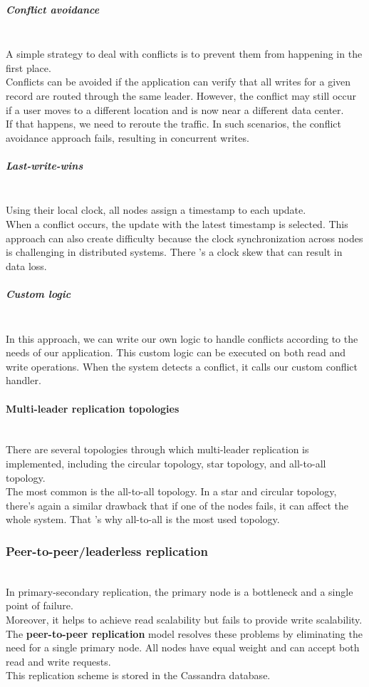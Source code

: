 \subparagraph{Conflict avoidance}\label{RrlEvY2LC0_iMpj_fvCKD}
\\
A simple strategy to deal with conflicts is to prevent them from happening in the first place.
\\
Conflicts can be avoided if the application can verify that all writes for a given record are routed through the same leader. However, the conflict may still occur if a user moves to a different location and is now near a different data center.
\\
If that happens, we need to reroute the traffic. In such scenarios, the conflict avoidance approach fails, resulting in concurrent writes.
\\
\subparagraph{Last-write-wins}\label{LzKP9dCVigj4ML9raycAn}
\\
Using their local clock, all nodes assign a timestamp to each update.
\\
When a conflict occurs, the update with the latest timestamp is selected. This approach can also create difficulty because the clock synchronization across nodes is challenging in distributed systems. There 's a clock skew that can result in data loss.
\\
\subparagraph{Custom logic}\label{jBSEvQ5WMSxuoh2qBu1Wb}
\\
In this approach, we can write our own logic to handle conflicts according to the needs of our application. This custom logic can be executed on both read and write operations. When the system detects a conflict, it calls our custom conflict handler.
\\
\paragraph{Multi-leader replication topologies}\label{8ZwbqOAgTbJQjoUtU0Prs}
\\
There are several topologies through which multi-leader replication is implemented, including the circular topology, star topology, and all-to-all topology.
\\
The most common is the all-to-all topology. In a star and circular topology, there's again a similar drawback that if one of the nodes fails, it can affect the whole system. That 's why all-to-all is the most used topology.

\subsubsection{Peer-to-peer/leaderless replication}\label{II-0xD6RiqVyVtslSa3r6}
\\
In primary-secondary replication, the primary node is a bottleneck and a single point of failure.
\\
Moreover, it helps to achieve read scalability but fails to provide write scalability. The \textbf{peer-to-peer replication} model resolves these problems by eliminating the need for a single primary node. All nodes have equal weight and can accept both read and write requests.
\\
This replication scheme is stored in the Cassandra database.

